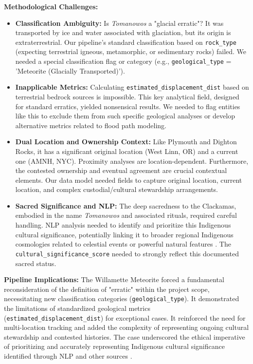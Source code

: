 \textbf{Methodological Challenges:}
\begin{itemize}
    \item \textbf{Classification Ambiguity:} Is \emph{Tomanowos} a "glacial erratic"? It was transported by ice and water associated with glaciation, but its origin is extraterrestrial. Our pipeline's standard classification based on \texttt{rock\_type} (expecting terrestrial igneous, metamorphic, or sedimentary rocks) failed. We needed a special classification flag or category (e.g., \texttt{geological\_type} = 'Meteorite (Glacially Transported)').
    \item \textbf{Inapplicable Metrics:} Calculating \texttt{estimated\_displacement\_dist} based on terrestrial bedrock sources is impossible. This key analytical field, designed for standard erratics, yielded nonsensical results. We needed to flag entities like this to exclude them from such specific geological analyses or develop alternative metrics related to flood path modeling.
    \item \textbf{Dual Location and Ownership Context:} Like Plymouth and Dighton Rocks, it has a significant original location (West Linn, OR) and a current one (AMNH, NYC). Proximity analyses are location-dependent. Furthermore, the contested ownership and eventual agreement are crucial contextual elements. Our data model needed fields to capture original location, current location, and complex custodial/cultural stewardship arrangements.
    \item \textbf{Sacred Significance and NLP:} The deep sacredness to the Clackamas, embodied in the name \emph{Tomanowos} and associated rituals, required careful handling. NLP analysis needed to identify and prioritize this Indigenous cultural significance, potentially linking it to broader regional Indigenous cosmologies related to celestial events or powerful natural features \cite{ourtimebdTomanowosMeteorite}. The \texttt{cultural\_significance\_score} needed to strongly reflect this documented sacred status.
\end{itemize}

\textbf{Pipeline Implications:} The Willamette Meteorite forced a fundamental reconsideration of the definition of "erratic" within the project scope, necessitating new classification categories (\texttt{geological\_type}). It demonstrated the limitations of standardized geological metrics (\texttt{estimated\_displacement\_dist}) for exceptional cases. It reinforced the need for multi-location tracking and added the complexity of representing ongoing cultural stewardship and contested histories. The case underscored the ethical imperative of prioritizing and accurately representing Indigenous cultural significance identified through NLP and other sources \cite{statesmanjournalPiecesSacred}.


